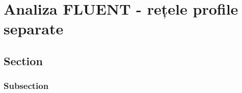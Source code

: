 \chapter{Analiza FLUENT - rețele profile separate}\label{chapter:analiza}

\section{Section}

\subsection{Subsection}